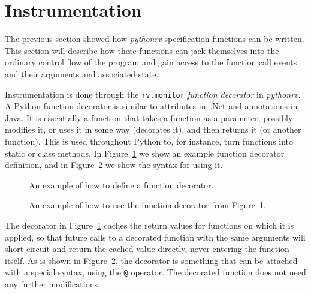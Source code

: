 \documentclass[a4paper,11pt]{kth-mag}
\theoremstyle{definition}
\begin{document}
\section{Instrumentation} \label{section-approach-instrumentation}

The previous section showed how \textit{pythonrv} specification functions can
be written. This section will describe how these functions can jack themselves
into the ordinary control flow of the program and gain access to the function
call events and their arguments and associated state.

Instrumentation is done through the \texttt{rv.monitor} \textit{function
decorator} in \textit{pythonrv}. A Python function decorator is similar to
attributes in~.Net and annotations in Java. It is essentially a function that
takes a function as a parameter, possibly modifies it, or uses it in some way
(decorates it), and then returns it (or another function). This is used
throughout Python to, for instance, turn functions into static or class
methods. In Figure~\ref{figure-function-decorator} we show an example function
decorator definition, and in Figure~\ref{figure-function-decorator-usages} we
show the syntax for using it.

\begin{figure}[h!]
	\begin{center}
	\begin{minipage}{0.7\textwidth}
	
	\end{minipage}
	\end{center}

	\caption{An example of how to define a function decorator.}
	\label{figure-function-decorator}
\end{figure}

\begin{figure}[h!]
	\begin{center}
	\begin{minipage}{0.7\textwidth}
	
	\end{minipage}
	\end{center}

	\caption{An example of how to use the function decorator from
	Figure~\ref{figure-function-decorator}.}
	\label{figure-function-decorator-usages}
\end{figure}

The decorator in Figure~\ref{figure-function-decorator} caches the return
values for functions on which it is applied, so that future calls to a
decorated function with the same arguments will short-circuit and return the
cached value directly, never entering the function itself. As is shown in
Figure~\ref{figure-function-decorator-usages}, the decorator is something that
can be attached with a special syntax, using the \texttt{@} operator. The
decorated function does not need any further modifications.
\end{document}

